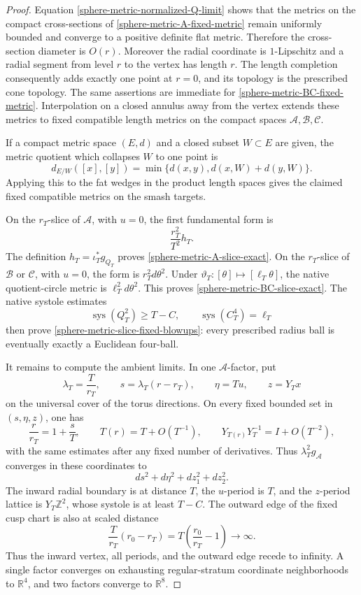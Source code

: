 \begin{proof}
Equation \eqref{sphere-metric-normalized-Q-limit} shows that the metrics on
the compact cross-sections of \eqref{sphere-metric-A-fixed-metric} remain
uniformly bounded and converge to a positive definite flat metric.
Therefore the cross-section diameter is \(O(r)\).  Moreover the radial
coordinate is \(1\)-Lipschitz and a radial segment from level \(r\) to the
vertex has length \(r\).  The length completion consequently adds exactly
one point at \(r=0\), and its topology is the prescribed cone topology.
The same assertions are immediate for
\eqref{sphere-metric-BC-fixed-metric}.  Interpolation on a closed annulus
away from the vertex extends these metrics to fixed compatible length
metrics on the compact spaces \(\mathcal A,\mathcal B,\mathcal C\).

If a compact metric space \((E,d)\) and a closed subset \(W\subset E\) are
given, the metric quotient which collapses \(W\) to one point is
\[
 d_{E/W}([x],[y])
 =\min\{d(x,y),d(x,W)+d(y,W)\}.
\]
Applying this to the fat wedges in the product length spaces gives the
claimed fixed compatible metrics on the smash targets.

On the \(r_T\)-slice of \(\mathcal A\), with \(u=0\), the first fundamental
form is
\[
 \frac{r_T^2}{T^2}h_T.
\]
The definition \(h_T=\iota_T^*g_{Q_T}\) proves
\eqref{sphere-metric-A-slice-exact}.  On the \(r_T\)-slice of
\(\mathcal B\) or \(\mathcal C\), with \(u=0\), the form is
\(r_T^2d\theta^2\).  Under
\(\vartheta_T:[\theta]\mapsto[\ell_T\theta]\), the native quotient-circle
metric is \(\ell_T^2d\theta^2\).  This proves
\eqref{sphere-metric-BC-slice-exact}.  The native systole estimates
\[
 \operatorname{sys}(Q_T^2)\geq T-C,
 \qquad
 \operatorname{sys}(C_T^4)=\ell_T
\]
then prove \eqref{sphere-metric-slice-fixed-blowups}: every prescribed
radius ball is eventually exactly a Euclidean four-ball.

It remains to compute the ambient limits.  In one \(\mathcal A\)-factor,
put
\[
 \lambda_T=\frac{T}{r_T},\qquad
 s=\lambda_T(r-r_T),\qquad
 \eta=Tu,\qquad z=Y_Tx
\]
on the universal cover of the torus directions.  On every fixed bounded
set in \((s,\eta,z)\), one has
\[
 \frac r{r_T}=1+\frac sT,
 \qquad
 T(r)=T+O(T^{-1}),
 \qquad
 Y_{T(r)}Y_T^{-1}=I+O(T^{-2}),
\]
with the same estimates after any fixed number of derivatives.  Thus
\(\lambda_T^2g_{\mathcal A}\) converges in these coordinates to
\[
 ds^2+d\eta^2+dz_1^2+dz_2^2.
\]
The inward radial boundary is at distance \(T\), the \(u\)-period is \(T\),
and the \(z\)-period lattice is \(Y_T\mathbb Z^2\), whose systole is at
least \(T-C\).  The outward edge of the fixed cusp chart is also at scaled
distance
\[
 \frac{T}{r_T}(r_0-r_T)
 =T\left(\frac{r_0}{r_T}-1\right)\longrightarrow\infty.
\]
Thus the inward vertex, all periods, and the outward edge recede to
infinity.  A single factor converges on exhausting regular-stratum
coordinate neighborhoods to \(\mathbb R^4\), and two factors converge to
\(\mathbb R^8\).


\end{proof}
